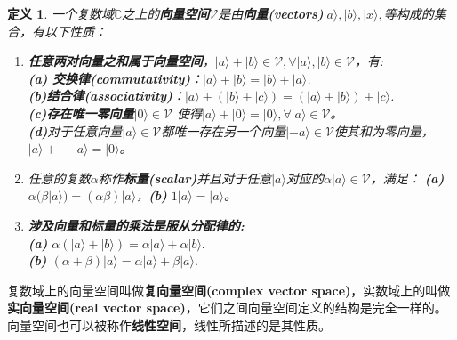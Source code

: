\documentclass[mathserif,hyperref,UTF8,openany,b5paper]{ctexbook}
\newtheorem{defn}{定义}[section]
\begin{document}
\begin{defn}
一个复数域$\mathbb{C}$之上的\textbf{向量空间}$\mathcal{V}$是由\textbf{向量(vectors)}$|a\rangle,|b\rangle,|x\rangle,$等构成的集合，有以下性质：
\begin{enumerate}
\item \textbf{任意两对向量之和属于向量空间}，$|a\rangle + |b\rangle \in \mathcal{V}, \forall |a\rangle,|b\rangle \in \mathcal{V}$，有:\\\textbf{(a) 交换律(commutativity)}：$|a\rangle + |b\rangle = |b\rangle + |a\rangle $. \\\textbf{(b)结合律(associativity)}：$|a\rangle + (|b\rangle + |c \rangle) = (|a\rangle + |b\rangle)+|c \rangle $. \\\textbf{(c)}\textbf{存在唯一零向量}$|0\rangle \in \mathcal{V}$ 使得$|a\rangle + |0\rangle = |0\rangle, \forall |a\rangle \in \mathcal{V} $。\\\textbf{(d)}对于任意向量$ |a\rangle \in \mathcal{V}$都唯一存在另一个向量$ |-a\rangle \in \mathcal{V}$使其和为零向量，$|a\rangle + |-a\rangle = |0\rangle $。
\item 任意的复数$\alpha$称作\textbf{标量(scalar)}并且对于任意$|a\rangle$对应的$\alpha|a\rangle \in \mathcal{V}$，满足： \textbf{(a)} $\alpha(\beta|a\rangle)=(\alpha\beta)|a\rangle$，\textbf{(b) } $1|a\rangle=|a\rangle$。
\item \textbf{涉及向量和标量的乘法是服从分配律的:}\\\textbf{(a) } $\alpha(|a\rangle + |b\rangle) = \alpha|a\rangle + \alpha|b\rangle. $ \\ \textbf{(b) } $(\alpha+\beta)|a\rangle = \alpha|a\rangle + \beta|a\rangle.$
\end{enumerate}
\end{defn}

复数域上的向量空间叫做\textbf{复向量空间(complex vector space)}，实数域上的叫做\textbf{实向量空间(real vector space)}，它们之间向量空间定义的结构是完全一样的。向量空间也可以被称作\textbf{线性空间}，线性所描述的是其性质。
\end{document}
